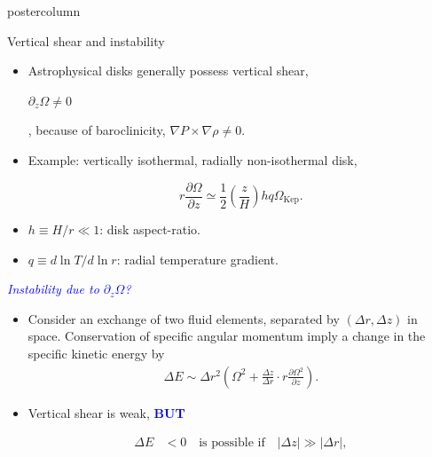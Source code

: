 \documentclass[final,hyperref={pdfpagelabels=false}]{beamer}
\newcommand{\p}{\partial}
\begin{document}
\begin{frame}
\begin{columns}
\begin{column}{.49\textwidth}
\begin{beamercolorbox}[center,wd=\textwidth]{postercolumn}
\begin{minipage}[T]{.95\textwidth}
{            
            \begin{block}{{\Large Vertical shear and instability}}
              \justifying
              \begin{itemize}
              \item Astrophysical disks generally possess vertical
                shear,\begin{onlinebox}{5cm}$\p_z\Omega\neq0$\end{onlinebox},
                because of baroclinicity, $\nabla P\times 
                \nabla\rho\neq0$.
              \item Example: vertically isothermal, radially
                non-isothermal disk,  
                \begin{displaybox}{15cm}
                  \[
                  r\frac{\p \Omega}{\p z} \simeq
                  \frac{1}{2}\left(\frac{z}{H}\right)h q
                  \Omega_\mathrm{Kep}.%
                  \]
              \end{displaybox}              
              \item $h \equiv H/r \ll 1$: disk aspect-ratio.
              \item $q \equiv d \ln{T}/d\ln{r}$: radial temperature
                gradient. 
              \end{itemize}
              \textcolor{blue}{\emph{Instability due to $\p_z\Omega$?}}
              \begin{itemize}
              \item 
                Consider an exchange of two fluid elements, separated by 
                $(\Delta r,\Delta z)$ in space. Conservation
                of specific angular momentum imply a change in the
                specific kinetic energy by
                \begin{align}
                  \Delta E  \sim \Delta r^2 \left(\Omega^2 +
                    \frac{\Delta z}{\Delta r}\cdot r\frac{\p\Omega^2}{\p
                      z}\right). \label{simple}
                \end{align}
                \item Vertical shear is weak, \textcolor{blue}{{\bf BUT}}  
                \begin{displaybox}{22cm}
                  \begin{align*}
                  \Delta E &<  0 \quad \text{is possible if} \quad \left|\Delta
                    z\right|\gg 
                  |\Delta r|,\\

\end{align*}
\end{displaybox}
\end{itemize}
\end{block}}
\end{minipage}
\end{beamercolorbox}
\end{column}
\end{columns}
\end{frame}
\end{document}
